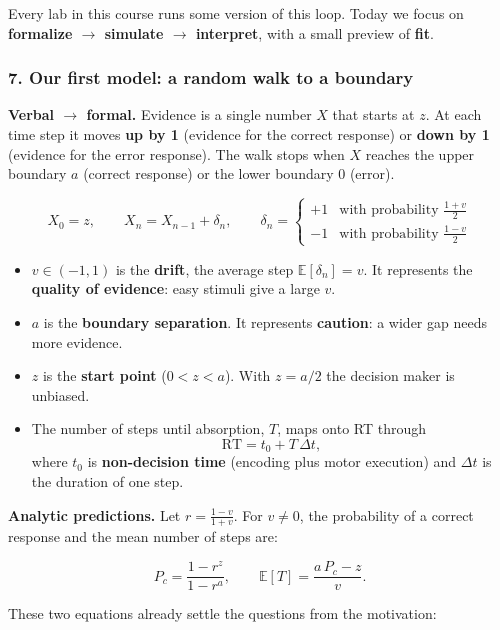 Every lab in this course runs some version of this loop. Today we focus
on \textbf{formalize \ensuremath{\rightarrow} simulate \ensuremath{\rightarrow} interpret}, with a small preview of
\textbf{fit}.

\subsubsection{7. Our first model: a random walk to a boundary}

\textbf{Verbal \ensuremath{\rightarrow} formal.} Evidence is a single number \(X\) that starts
at \(z\). At each time step it moves \textbf{up by 1} (evidence for the
correct response) or \textbf{down by 1} (evidence for the error
response). The walk stops when \(X\) reaches the upper boundary \(a\)
(correct response) or the lower boundary \(0\) (error).

\[
X_0 = z, \qquad X_{n} = X_{n-1} + \delta_n, \qquad
\delta_n =
\begin{cases}
+1 & \text{with probability } \tfrac{1+v}{2}\\[2pt]
-1 & \text{with probability } \tfrac{1-v}{2}
\end{cases}
\]

\begin{itemize}
\tightlist
\item
  \(v \in (-1, 1)\) is the \textbf{drift}, the average step
  \(\mathbb{E}[\delta_n] = v\). It represents the \textbf{quality of
  evidence}: easy stimuli give a large \(v\).
\item
  \(a\) is the \textbf{boundary separation}. It represents
  \textbf{caution}: a wider gap needs more evidence.
\item
  \(z\) is the \textbf{start point} (\(0 < z < a\)). With \(z = a/2\)
  the decision maker is unbiased.
\item
  The number of steps until absorption, \(T\), maps onto RT through \[
  \mathrm{RT} = t_0 + T\,\Delta t,
  \] where \(t_0\) is \textbf{non-decision time} (encoding plus motor
  execution) and \(\Delta t\) is the duration of one step.
\end{itemize}

\textbf{Analytic predictions.} Let \(r = \frac{1-v}{1+v}\). For
\(v \neq 0\), the probability of a correct response and the mean number
of steps are:

\[
P_c = \frac{1 - r^{z}}{1 - r^{a}}, \qquad
\mathbb{E}[T] = \frac{a\,P_c - z}{v}.
\]

These two equations already settle the questions from the motivation:

